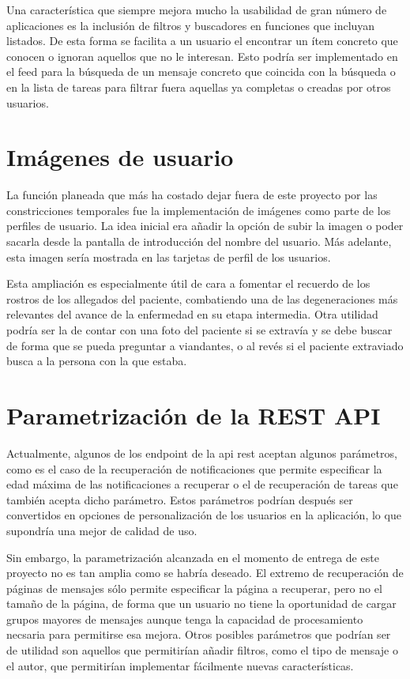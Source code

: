 Una característica que siempre mejora mucho la usabilidad de gran número de aplicaciones es la inclusión de filtros y buscadores en funciones que incluyan listados. De esta forma se facilita a un usuario el encontrar un ítem concreto que conocen o ignoran aquellos que no le interesan. Esto podría ser implementado en el feed para la búsqueda de un mensaje concreto que coincida con la búsqueda o en la lista de tareas para filtrar fuera aquellas ya completas o creadas por otros usuarios.

\section{Imágenes de usuario}

La función planeada que más ha costado dejar fuera de este proyecto por las constricciones temporales fue la implementación de imágenes como parte de los perfiles de usuario. La idea inicial era añadir la opción de subir la imagen o poder sacarla desde la pantalla de introducción del nombre del usuario. Más adelante, esta imagen sería mostrada en las tarjetas de perfil de los usuarios.

Esta ampliación es especialmente útil de cara a fomentar el recuerdo de los rostros de los allegados del paciente, combatiendo una de las degeneraciones más relevantes del avance de la enfermedad en su etapa intermedia. Otra utilidad podría ser la de contar con una foto del paciente si se extravía y se debe buscar de forma que se pueda preguntar a viandantes, o al revés si el paciente extraviado busca a la persona con la que estaba.

\section{Parametrización de la REST API}

Actualmente, algunos de los \gls{endpoint} de la \acrshort{api} \acrshort{rest} aceptan algunos parámetros, como es el caso de la recuperación de notificaciones que permite especificar la edad máxima de las notificaciones a recuperar o el de recuperación de tareas que también acepta dicho parámetro. Estos parámetros podrían después ser convertidos en opciones de personalización de los usuarios en la aplicación, lo que supondría una mejor de calidad de uso.

Sin embargo, la parametrización alcanzada en el momento de entrega de este proyecto no es tan amplia como se habría deseado. El extremo de recuperación de páginas de mensajes sólo permite especificar la página a recuperar, pero no el tamaño de la página, de forma que un usuario no tiene la oportunidad de cargar grupos mayores de mensajes aunque tenga la capacidad de procesamiento necsaria para permitirse esa mejora. Otros posibles parámetros que podrían ser de utilidad son aquellos que permitirían añadir filtros, como el tipo de mensaje o el autor, que permitirían implementar fácilmente nuevas características.